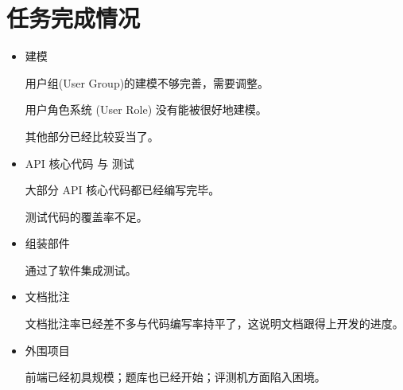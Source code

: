 \chapter{任务完成情况}

\begin{itemize}
    \item 建模
    
    用户组(User Group)的建模不够完善，需要调整。
    
    用户角色系统 (User Role) 没有能被很好地建模。
    
    其他部分已经比较妥当了。
    
    \item API 核心代码 与 测试
    
    大部分 API 核心代码都已经编写完毕。
    
    测试代码的覆盖率不足。
    
    \item 组装部件
    
    通过了软件集成测试。
    
    \item 文档批注
    
    文档批注率已经差不多与代码编写率持平了，这说明文档跟得上开发的进度。
        
    \item 外围项目
    
    前端已经初具规模；题库也已经开始；评测机方面陷入困境。
    
\end{itemize}
